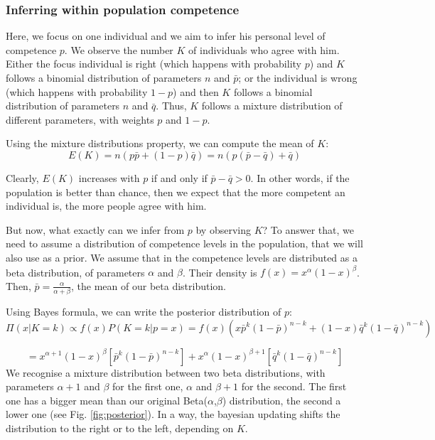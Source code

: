 \documentclass[
  doc,floatsintext]{apa6}
\begin{document}
\subsubsection{Inferring within population competence}\label{inferring-within-population-competence}

Here, we focus on one individual and we aim to infer his personal level of competence \(p\). We observe the number \(K\) of individuals who agree with him. Either the focus individual is right (which happens with probability \(p\)) and \(K\) follows a binomial distribution of parameters \(n\) and \(\bar p\); or the individual is wrong (which happens with probability \(1-p\)) and then \(K\) follows a binomial distribution of parameters \(n\) and \(\bar q\). Thus, \(K\) follows a mixture distribution of different parameters, with weights \(p\) and \(1-p\).

Using the mixture distributions property, we can compute the mean of \(K\):
\[
E(K) = n(p \bar p + (1-p)\bar q) = n(p (\bar p - \bar q) + \bar q)
\]

Clearly, \(E(K)\) increases with \(p\) if and only if \(\bar p - \bar q > 0\). In other words, if the population is better than chance, then we expect that the more competent an individual is, the more people agree with him.

But now, what exactly can we infer from \(p\) by observing \(K\)? To answer that, we need to assume a distribution of competence levels in the population, that we will also use as a prior. We assume that in the competence levels are distributed as a beta distribution, of parameters \(\alpha\) and \(\beta\). Their density is \(f(x) = x^\alpha(1-x)^\beta\). Then, \(\bar p = \frac{\alpha}{\alpha+\beta}\), the mean of our beta distribution.

Using Bayes formula, we can write the posterior distribution of \(p\):
\[
\Pi(x|K=k) \propto f(x)P(K=k|p=x) = f(x)(x\bar p^k(1-\bar p)^{n-k} + (1-x)\bar q^k (1-\bar q)^{n-k})
\]

\[
= x^{\alpha+1}(1-x)^\beta[\bar p^k(1-\bar p)^{n-k}] + x^{\alpha}(1-x)^{\beta+1} [\bar q^k (1-\bar q)^{n-k}]
\]
We recognise a mixture distribution between two beta distributions, with parameters \(\alpha+1\) and \(\beta\) for the first one, \(\alpha\) and \(\beta + 1\) for the second. The first one has a bigger mean than our original Beta(\(\alpha\),\(\beta\)) distribution, the second a lower one (see Fig. \ref{fig:posterior}). In a way, the bayesian updating shifts the distribution to the right or to the left, depending on \(K\).
\end{document}
